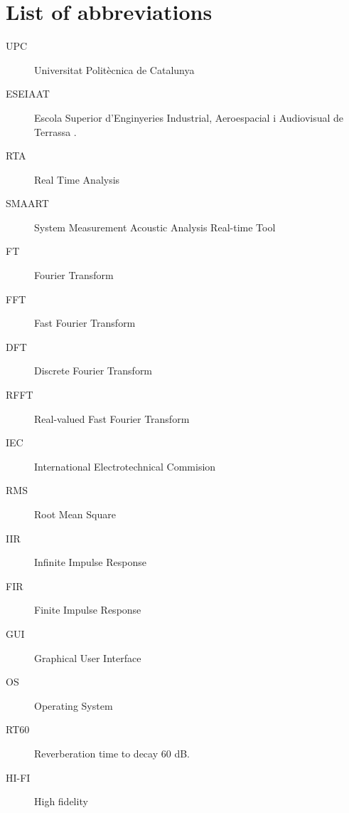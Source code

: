 \chapter*{List of abbreviations}

\begin{description}
	\item[UPC] Universitat Politècnica de Catalunya
	\item[ESEIAAT] Escola Superior d’Enginyeries Industrial, Aeroespacial i Audiovisual de Terrassa \cite{eseiaat}.
	\item[RTA] Real Time Analysis
	\item[SMAART] System Measurement Acoustic Analysis Real-time Tool
	\item[FT] Fourier Transform
	\item[FFT] Fast Fourier Transform
	\item[DFT] Discrete Fourier Transform
	\item[RFFT] Real-valued Fast Fourier Transform
	\item[IEC] International Electrotechnical Commision
	\item[RMS] Root Mean Square
	\item[IIR] Infinite Impulse Response
	\item[FIR] Finite Impulse Response
	\item[GUI] Graphical User Interface
	\item[OS] Operating System
	\item[RT60] Reverberation time to decay 60 dB.
	\item[HI-FI] High fidelity

\end{description}
